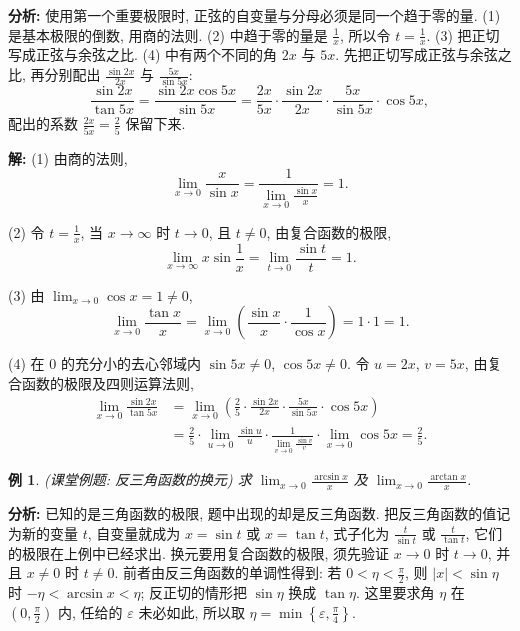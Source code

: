\documentclass[UTF8,openany]{ctexbook}
\theoremstyle{chinesetextbook}
\newtheorem{example}{例}[section]
\newenvironment{cnsolution}{\par\indent\textbf{解:} \ignorespaces}{\par}
\begin{document}
\par\indent\textbf{分析:} 使用第一个重要极限时, 正弦的自变量与分母必须是同一个趋于零的量. (1) 是基本极限的倒数, 用商的法则. (2) 中趋于零的量是 $\displaystyle\frac1x$, 所以令 $\displaystyle t=\frac1x$. (3) 把正切写成正弦与余弦之比. (4) 中有两个不同的角 $2x$ 与 $5x$. 先把正切写成正弦与余弦之比, 再分别配出 $\displaystyle\frac{\sin2x}{2x}$ 与 $\displaystyle\frac{5x}{\sin5x}$:
\[
\frac{\sin2x}{\tan5x}=\frac{\sin2x\cos5x}{\sin5x}=\frac{2x}{5x}\cdot\frac{\sin2x}{2x}\cdot\frac{5x}{\sin5x}\cdot\cos5x,
\]
配出的系数 $\displaystyle\frac{2x}{5x}=\frac25$ 保留下来.
\begin{cnsolution}
(1) 由商的法则,
\[
\lim_{x\to0}\frac x{\sin x}=\frac1{\displaystyle\lim_{x\to0}\frac{\sin x}x}=1.
\]

(2) 令 $\displaystyle t=\frac1x$, 当 $x\to\infty$ 时 $t\to0$, 且 $t\ne0$, 由复合函数的极限,
\[
\lim_{x\to\infty}x\sin\frac1x=\lim_{t\to0}\frac{\sin t}t=1.
\]

(3) 由 $\displaystyle\lim_{x\to0}\cos x=1\ne0$,
\[
\lim_{x\to0}\frac{\tan x}x=\lim_{x\to0}\left(\frac{\sin x}x\cdot\frac1{\cos x}\right)=1\cdot1=1.
\]

(4) 在 $0$ 的充分小的去心邻域内 $\sin5x\ne0$, $\cos5x\ne0$. 令 $u=2x$, $v=5x$, 由复合函数的极限及四则运算法则,
\[
\begin{aligned}
\lim_{x\to0}\frac{\sin2x}{\tan5x}
&=\lim_{x\to0}\left(\frac25\cdot\frac{\sin2x}{2x}\cdot\frac{5x}{\sin5x}\cdot\cos5x\right)\\
&=\frac25\cdot\lim_{u\to0}\frac{\sin u}u\cdot\frac1{\displaystyle\lim_{v\to0}\frac{\sin v}v}\cdot\lim_{x\to0}\cos5x=\frac25.
\end{aligned}
\]
\end{cnsolution}
\begin{example}
\textnormal{(课堂例题: 反三角函数的换元)} 求 $\displaystyle\lim_{x\to0}\frac{\arcsin x}x$ 及 $\displaystyle\lim_{x\to0}\frac{\arctan x}x$.
\end{example}
\par\indent\textbf{分析:} 已知的是三角函数的极限, 题中出现的却是反三角函数. 把反三角函数的值记为新的变量 $t$, 自变量就成为 $x=\sin t$ 或 $x=\tan t$, 式子化为 $\displaystyle\frac t{\sin t}$ 或 $\displaystyle\frac t{\tan t}$, 它们的极限在上例中已经求出. 换元要用复合函数的极限, 须先验证 $x\to0$ 时 $t\to0$, 并且 $x\ne0$ 时 $t\ne0$. 前者由反三角函数的单调性得到: 若 $\displaystyle0<\eta<\frac\pi2$, 则 $|x|<\sin\eta$ 时 $-\eta<\arcsin x<\eta$; 反正切的情形把 $\sin\eta$ 换成 $\tan\eta$. 这里要求角 $\eta$ 在 $\displaystyle\left(0,\frac\pi2\right)$ 内, 任给的 $\varepsilon$ 未必如此, 所以取 $\displaystyle\eta=\min\left\{\varepsilon,\frac\pi4\right\}$.
\end{document}
